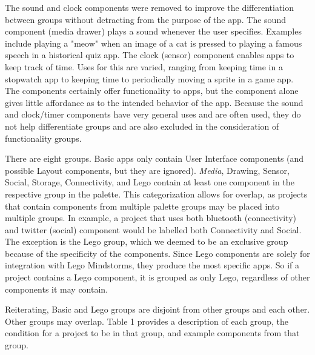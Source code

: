 \documentclass[conference]{IEEEtran}
\begin{document}
The sound and clock components were removed to improve the differentiation between groups without detracting from the purpose of the app. The sound component (media drawer) plays a sound whenever the user specifies. Examples include playing a "meow" when an image of a cat is pressed to playing a famous speech in a historical quiz app. The clock (sensor) component enables apps to keep track of time. Uses for this are varied, ranging from keeping time in a stopwatch app to keeping time to periodically moving a sprite in a game app. The components certainly offer functionality to apps, but the component alone gives little affordance as to the intended behavior of the app. Because the sound and clock/timer components have very general uses and are often used, they do not help differentiate groups and are also excluded in the consideration of functionality groups.

There are eight groups. Basic apps only contain User Interface components (and possible Layout components, but they are ignored). \emph{Media}, Drawing, Sensor, Social, Storage, Connectivity, and Lego contain at least one component in the respective group in the palette. This categorization allows for overlap, as projects that contain components from multiple palette groups may be placed into multiple groups. In example, a project that uses both bluetooth (connectivity) and  twitter (social) component would be labelled both Connectivity and Social. The exception is the Lego group, which we deemed to be an exclusive group because of the specificity of the components. Since Lego components are solely for integration with Lego Mindstorms, they produce the most specific apps. So if a project contains a Lego component, it is grouped as only Lego, regardless of other components it may contain. 

Reiterating, Basic and Lego groups are disjoint from other groups and each other. Other groups may overlap. Table 1 provides a description of each group, the condition for a project to be in that group, and example components from that group.
\end{document}
